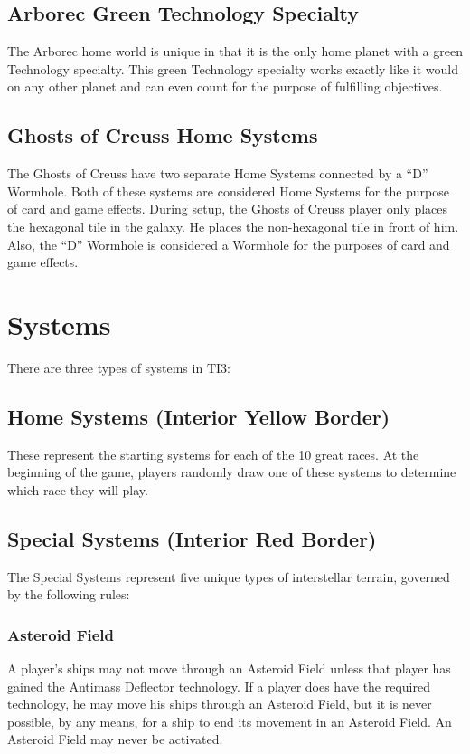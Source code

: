 \documentclass[11pt,fleqn]{book} %
\begin{document}
\begin{STbox}
	
\subsection{Arborec Green Technology Specialty}
The Arborec home world is unique in that it is the only home planet with a green Technology 
specialty.
This green Technology specialty works exactly like it would on any other planet and can even count for the purpose of fulfilling objectives.

\subsection{Ghosts of Creuss Home Systems}
The Ghosts of Creuss have two separate Home Systems connected by a “D” Wormhole.
Both of these systems are considered Home Systems for the purpose of card and game effects. During setup, the Ghosts of Creuss player only places the hexagonal tile in the galaxy.
He places the non-hexagonal tile in front of him.
Also, the “D” Wormhole is considered a Wormhole for the purposes of card and game effects.
\end{STbox}

\section{Systems}
There are three types of systems in TI3:

\subsection{Home Systems (Interior Yellow Border)}
These represent the starting systems for each of the 10 great races.
At the beginning of the game, players randomly draw one of these systems to determine which race they will play.

\subsection{Special Systems (Interior Red Border)} 
The Special Systems represent five unique types of interstellar terrain, governed by the following rules:

\subsubsection{Asteroid Field} 
A player's ships may not move through an Asteroid Field unless that player has gained the Antimass Deflector technology. 
If a player does have the required technology, he may move his ships through an Asteroid Field, but it is never possible, by any means, for a ship to end its movement in an Asteroid Field. An Asteroid Field may never be activated.
\end{document}

